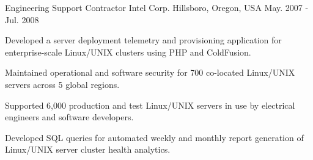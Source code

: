 \begin{cventries}
  \begin{detailSection}
    \cventry
      {Engineering Support Contractor} %
      {Intel Corp.} %
      {Hillsboro, Oregon, USA} %
      {May. 2007 - Jul. 2008} %
      {
     	  \begin{cvitems} %
          \item {Developed a server deployment telemetry and provisioning application for enterprise-scale Linux/UNIX clusters using PHP and ColdFusion.}
          \item {Maintained operational and software security for 700 co-located Linux/UNIX servers across 5 global regions.}
          \item {Supported 6,000 production and test Linux/UNIX servers in use by electrical engineers and software developers.}
          \item {Developed SQL queries for automated weekly and monthly report generation of Linux/UNIX server cluster health analytics.}
        \end{cvitems}
      }  
  \end{detailSection}

\end{cventries}

